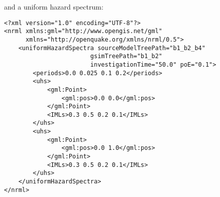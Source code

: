 %

\noindent and a uniform hazard spectrum:

\begin{verbatim}
<?xml version="1.0" encoding="UTF-8"?>
<nrml xmlns:gml="http://www.opengis.net/gml"
      xmlns="http://openquake.org/xmlns/nrml/0.5">
    <uniformHazardSpectra sourceModelTreePath="b1_b2_b4"
                        gsimTreePath="b1_b2"
                        investigationTime="50.0" poE="0.1">
        <periods>0.0 0.025 0.1 0.2</periods>
        <uhs>
            <gml:Point>
                <gml:pos>0.0 0.0</gml:pos>
            </gml:Point>
            <IMLs>0.3 0.5 0.2 0.1</IMLs>
        </uhs>
        <uhs>
            <gml:Point>
                <gml:pos>0.0 1.0</gml:pos>
            </gml:Point>
            <IMLs>0.3 0.5 0.2 0.1</IMLs>
        </uhs>
    </uniformHazardSpectra>
</nrml>
\end{verbatim}
%